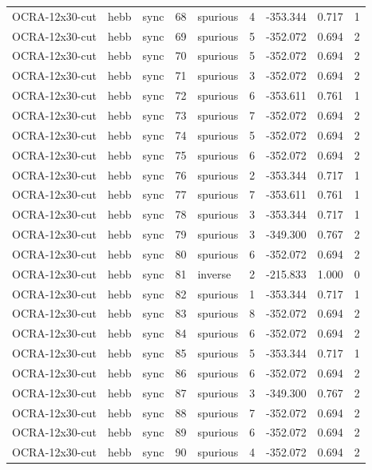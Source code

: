 \begin{tabular}{lllrlrrrr}
OCRA-12x30-cut & hebb & sync & 68 & spurious & 4 & -353.344 & 0.717 & 1 \\
OCRA-12x30-cut & hebb & sync & 69 & spurious & 5 & -352.072 & 0.694 & 2 \\
OCRA-12x30-cut & hebb & sync & 70 & spurious & 5 & -352.072 & 0.694 & 2 \\
OCRA-12x30-cut & hebb & sync & 71 & spurious & 3 & -352.072 & 0.694 & 2 \\
OCRA-12x30-cut & hebb & sync & 72 & spurious & 6 & -353.611 & 0.761 & 1 \\
OCRA-12x30-cut & hebb & sync & 73 & spurious & 7 & -352.072 & 0.694 & 2 \\
OCRA-12x30-cut & hebb & sync & 74 & spurious & 5 & -352.072 & 0.694 & 2 \\
OCRA-12x30-cut & hebb & sync & 75 & spurious & 6 & -352.072 & 0.694 & 2 \\
OCRA-12x30-cut & hebb & sync & 76 & spurious & 2 & -353.344 & 0.717 & 1 \\
OCRA-12x30-cut & hebb & sync & 77 & spurious & 7 & -353.611 & 0.761 & 1 \\
OCRA-12x30-cut & hebb & sync & 78 & spurious & 3 & -353.344 & 0.717 & 1 \\
OCRA-12x30-cut & hebb & sync & 79 & spurious & 3 & -349.300 & 0.767 & 2 \\
OCRA-12x30-cut & hebb & sync & 80 & spurious & 6 & -352.072 & 0.694 & 2 \\
OCRA-12x30-cut & hebb & sync & 81 & inverse & 2 & -215.833 & 1.000 & 0 \\
OCRA-12x30-cut & hebb & sync & 82 & spurious & 1 & -353.344 & 0.717 & 1 \\
OCRA-12x30-cut & hebb & sync & 83 & spurious & 8 & -352.072 & 0.694 & 2 \\
OCRA-12x30-cut & hebb & sync & 84 & spurious & 6 & -352.072 & 0.694 & 2 \\
OCRA-12x30-cut & hebb & sync & 85 & spurious & 5 & -353.344 & 0.717 & 1 \\
OCRA-12x30-cut & hebb & sync & 86 & spurious & 6 & -352.072 & 0.694 & 2 \\
OCRA-12x30-cut & hebb & sync & 87 & spurious & 3 & -349.300 & 0.767 & 2 \\
OCRA-12x30-cut & hebb & sync & 88 & spurious & 7 & -352.072 & 0.694 & 2 \\
OCRA-12x30-cut & hebb & sync & 89 & spurious & 6 & -352.072 & 0.694 & 2 \\
OCRA-12x30-cut & hebb & sync & 90 & spurious & 4 & -352.072 & 0.694 & 2 \\

\end{tabular}

